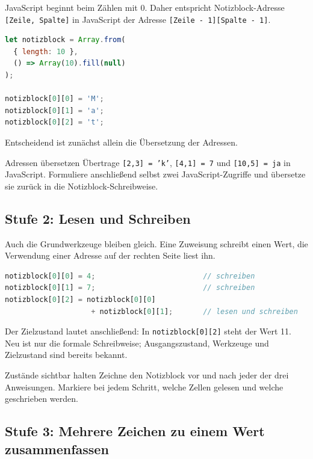 \documentclass{article}
\begin{document}
JavaScript beginnt beim Zählen mit 0. Daher entspricht Notizblock-Adresse \texttt{[Zeile, Spalte]} in JavaScript der Adresse \texttt{[Zeile - 1][Spalte - 1]}.

\begin{lstlisting}[language=JavaScript]
let notizblock = Array.from(
  { length: 10 },
  () => Array(10).fill(null)
);

notizblock[0][0] = 'M';
notizblock[0][1] = 'a';
notizblock[0][2] = 't';
\end{lstlisting}

Entscheidend ist zunächst allein die Übersetzung der Adressen.

\begin{uebung}{Adressen übersetzen}
Übertrage \texttt{[2,3] = 'k'}, \texttt{[4,1] = 7} und \texttt{[10,5] = ja} in JavaScript. Formuliere anschließend selbst zwei JavaScript-Zugriffe und übersetze sie zurück in die Notizblock-Schreibweise.
\end{uebung}

\subsection{Stufe 2: Lesen und Schreiben}

Auch die Grundwerkzeuge bleiben gleich. Eine Zuweisung schreibt einen Wert, die Verwendung einer Adresse auf der rechten Seite liest ihn.

\begin{lstlisting}[language=JavaScript]
notizblock[0][0] = 4;                         // schreiben
notizblock[0][1] = 7;                         // schreiben
notizblock[0][2] = notizblock[0][0]
                    + notizblock[0][1];       // lesen und schreiben
\end{lstlisting}

Der Zielzustand lautet anschließend: In \texttt{notizblock[0][2]} steht der Wert 11. Neu ist nur die formale Schreibweise; Ausgangszustand, Werkzeuge und Zielzustand sind bereits bekannt.

\begin{uebung}{Zustände sichtbar halten}
Zeichne den Notizblock vor und nach jeder der drei Anweisungen. Markiere bei jedem Schritt, welche Zellen gelesen und welche geschrieben werden.
\end{uebung}

\subsection{Stufe 3: Mehrere Zeichen zu einem Wert zusammenfassen}
\end{document}
